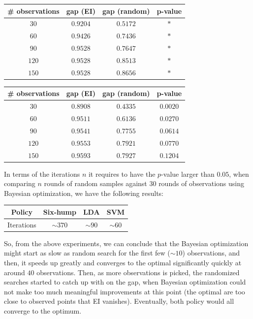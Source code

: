 \documentclass[12pt,a4paper]{article}
\begin{document}
\begin{center}
\begin{tabular}{|c|c|c|c|}
\hline
\# observations & gap (EI) & gap (random) & p-value \\
\hline
 $30$ & $0.9204$ & $0.5172$ & $*$ \\
\hline
 $60$ & $0.9426$ & $0.7436$ & $*$ \\
\hline
 $90$ & $0.9528$ & $0.7647$ & $*$ \\
\hline
$120$ & $0.9528$ & $0.8513$ & $*$ \\
\hline
$150$ & $0.9528$ & $0.8656$ & $*$ \\
\hline
\end{tabular}
\end{center}

\begin{center}
\begin{tabular}{|c|c|c|c|}
\hline
\# observations & gap (EI) & gap (random) & p-value \\
\hline
 $30$ & $0.8908$ & $0.4335$ & $0.0020$ \\
\hline
 $60$ & $0.9511$ & $0.6136$ & $0.0270$ \\
\hline
 $90$ & $0.9541$ & $0.7755$ & $0.0614$ \\
\hline
$120$ & $0.9553$ & $0.7921$ & $0.0770$ \\
\hline
$150$ & $0.9593$ & $0.7927$ & $0.1204$ \\
\hline
\end{tabular}
\end{center}

In terms of the iterations $n$ it requires to have the $p$-value larger than $0.05$, when comparing $n$ rounds of random samples against $30$ rounds of observations using Bayesian optimization, we have the following results:

\begin{center}
\begin{tabular}{|c|c|c|c|}
\hline
Policy & Six-hump & LDA & SVM \\
\hline
Iterations & $\sim370$ & $\sim90$ & $\sim60$ \\
\hline
\end{tabular}
\end{center}

So, from the above experiments, we can conclude that the Bayesian optimization might start as slow as random search for the first few ($\sim10$) observations, and then, it speeds up greatly and converges to the optimal significantly quickly at around $40$ observations. Then, as more observations is picked, the randomized searches started to catch up with on the gap, when Bayesian optimization could not make too much meaningful improvements at this point (the optimal are too close to observed points that EI vanishes). Eventually, both policy would all converge to the optimum.
\end{document}
